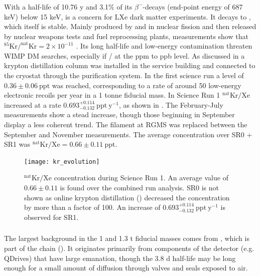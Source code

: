 \subsubsection{}
\label{subsubsec:backgrounds_electronic_krypton}
With a half-life of 10.76 y and 3.1\% of its $\beta^-$-decays (end-point energy of 687 keV) below 15 keV,  is a concern for
LXe dark matter experiments.  It decays to , which itself is stable.  Mainly
produced by  and  in nuclear fission and then released by nuclear weapons tests and fuel reprocessing plants,
measurements show that $\mathrm{^{85}Kr / ^{nat}Kr} = 2 \times 10^{-11}$ .  Its long half-life and low-energy
contamination threaten WIMP DM searches, especially if / at the ppm to ppb level.  As discussed in
 a krypton distillation column was installed in the service building and connected to the cryostat through
the purification system.  In the first science run a level of $0.36 \pm 0.06\ \mathrm{ppt}$ was reached, corresponding to a rate of
around 50 low-energy electronic recoils per year in a 1 tonne fiducial mass.  In Science Run 1 $\mathrm{^{nat}Kr / Xe}$ increased at a
rate $0.693_{-0.132}^{+0.114}\ \mathrm{ppt\ y^{-1}}$, as shown in .  The
February-July
measurements show a stead increase, though those beginning in September display a less coherent trend.  The filament at RGMS was replaced
between the September and November measurements.  The average concentration over SR0 + SR1 was
$^{\mathrm{nat}}\mathrm{Kr}/\mathrm{Xe} = 0.66 \pm 0.11\ \mathrm{ppt}$.

\begin{figure}
\centering
\texttt{[image: kr\_evolution]}
\caption[$\mathrm{^{nat}Kr / Xe}$ concentration during Science Run 1.  An average value of $0.66 \pm 0.11$ is found over the combined
run analysis.  An increase of $0.693_{-0.132}^{+0.114}\ \mathrm{ppt\ y^{-1}}$ is observed.]{$\mathrm{^{nat}Kr / Xe}$ concentration during
Science Run 1.  An average value of $0.66 \pm 0.11$ is found over the combined
run analysis.  SR0 is not shown as online krypton distillation () decreased the concentration by more than
a factor of 100.  An increase of $0.693_{-0.132}^{+0.114}\ \mathrm{ppt\ y^{-1}}$ is observed for SR1.}
\label{fig:backgrounds_electronic_krypton_rate_increase}
\end{figure}

\subsubsection{}
\label{subsubsec:backgrounds_electronic_radon}
The largest background in the 1 and 1.3 t fiducial masses comes from , which is part of the  chain
().  It originates primarily from components of the detector (e.g. QDrives) that have large
 emanation, though the 3.8 d half-life may be long enough for a small amount of diffusion through valves and seals
exposed to air.

